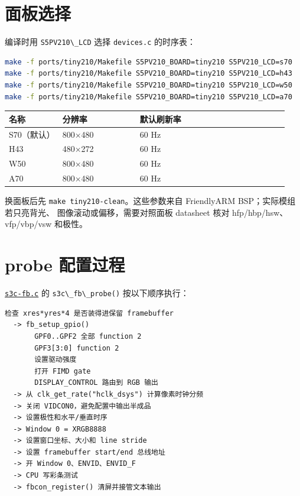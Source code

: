\section{面板选择}\label{ux9762ux677fux9009ux62e9}

编译时用 \passthrough{\lstinline!S5PV210\_LCD!} 选择
\passthrough{\lstinline!devices.c!} 的时序表：

\begin{lstlisting}[language=sh]
make -f ports/tiny210/Makefile S5PV210_BOARD=tiny210 S5PV210_LCD=s70
make -f ports/tiny210/Makefile S5PV210_BOARD=tiny210 S5PV210_LCD=h43
make -f ports/tiny210/Makefile S5PV210_BOARD=tiny210 S5PV210_LCD=w50
make -f ports/tiny210/Makefile S5PV210_BOARD=tiny210 S5PV210_LCD=a70
\end{lstlisting}

{\def\LTcaptype{none} %
\begin{longtable}[]{@{}p{0.18\linewidth}p{0.26\linewidth}p{0.50\linewidth}@{}}
\toprule\noalign{}
名称 & 分辨率 & 默认刷新率 \\
\midrule\noalign{}
\endhead
\bottomrule\noalign{}
\endlastfoot
S70（默认） & 800×480 & 60 Hz \\
H43 & 480×272 & 60 Hz \\
W50 & 800×480 & 60 Hz \\
A70 & 800×480 & 60 Hz \\
\end{longtable}
}

换面板后先 \passthrough{\lstinline!make tiny210-clean!}。这些参数来自
FriendlyARM BSP；实际模组若只亮背光、 图像滚动或偏移，需要对照面板
datasheet 核对 hfp/hbp/hsw、vfp/vbp/vsw 和极性。

\section{probe 配置过程}\label{probe-ux914dux7f6eux8fc7ux7a0b}

\href{../../../kernel/drivers/video/fbdev/s3c-fb.c}{\passthrough{\lstinline!s3c-fb.c!}}
的 \passthrough{\lstinline!s3c\_fb\_probe()!} 按以下顺序执行：

\begin{lstlisting}
检查 xres*yres*4 是否装得进保留 framebuffer
  -> fb_setup_gpio()
       GPF0..GPF2 全部 function 2
       GPF3[3:0] function 2
       设置驱动强度
       打开 FIMD gate
       DISPLAY_CONTROL 路由到 RGB 输出
  -> 从 clk_get_rate("hclk_dsys") 计算像素时钟分频
  -> 关闭 VIDCON0，避免配置中输出半成品
  -> 设置极性和水平/垂直时序
  -> Window 0 = XRGB8888
  -> 设置窗口坐标、大小和 line stride
  -> 设置 framebuffer start/end 总线地址
  -> 开 Window 0、ENVID、ENVID_F
  -> CPU 写彩条测试
  -> fbcon_register() 清屏并接管文本输出
\end{lstlisting}

